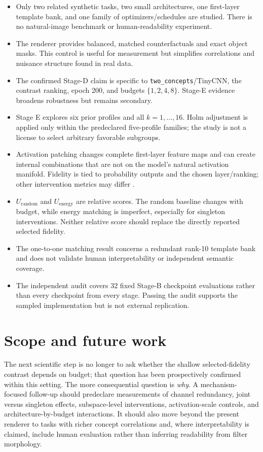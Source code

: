 \documentclass[10pt]{article}
\begin{document}
\begin{itemize}
\item Only two related synthetic tasks, two small architectures, one first-layer template bank, and one family of optimizers/schedules are studied. There is no natural-image benchmark or human-readability experiment.
\item The renderer provides balanced, matched counterfactuals and exact object masks. This control is useful for measurement but simplifies correlations and nuisance structure found in real data.
\item The confirmed Stage-D claim is specific to \texttt{two\_concepts}/TinyCNN, the contrast ranking, epoch 200, and budgets $\{1,2,4,8\}$. Stage-E evidence broadens robustness but remains secondary.
\item Stage E explores six prior profiles and all $k=1,\ldots,16$. Holm adjustment is applied only within the predeclared five-profile families; the study is not a license to select arbitrary favorable subgroups.
\item Activation patching changes complete first-layer feature maps and can create internal combinations that are not on the model's natural activation manifold. Fidelity is tied to probability outputs and the chosen layer/ranking; other intervention metrics may differ \citep{zhang_2024_activation-patching,heimersheim_2024_activation-patching}.
\item $U_{\mathrm{random}}$ and $U_{\mathrm{energy}}$ are relative scores. The random baseline changes with budget, while energy matching is imperfect, especially for singleton interventions. Neither relative score should replace the directly reported selected fidelity.
\item The one-to-one matching result concerns a redundant rank-10 template bank and does not validate human interpretability or independent semantic coverage.
\item The independent audit covers 32 fixed Stage-B checkpoint evaluations rather than every checkpoint from every stage. Passing the audit supports the sampled implementation but is not external replication.
\end{itemize}

\section{Scope and future work}\label{sec:future}

The next scientific step is no longer to ask whether the shallow selected-fidelity contrast depends on budget; that question has been prospectively confirmed within this setting. The more consequential question is \emph{why}. A mechanism-focused follow-up should predeclare measurements of channel redundancy, joint versus singleton effects, subspace-level interventions, activation-scale controls, and architecture-by-budget interactions. It should also move beyond the present renderer to tasks with richer concept correlations and, where interpretability is claimed, include human evaluation rather than inferring readability from filter morphology.
\end{document}
